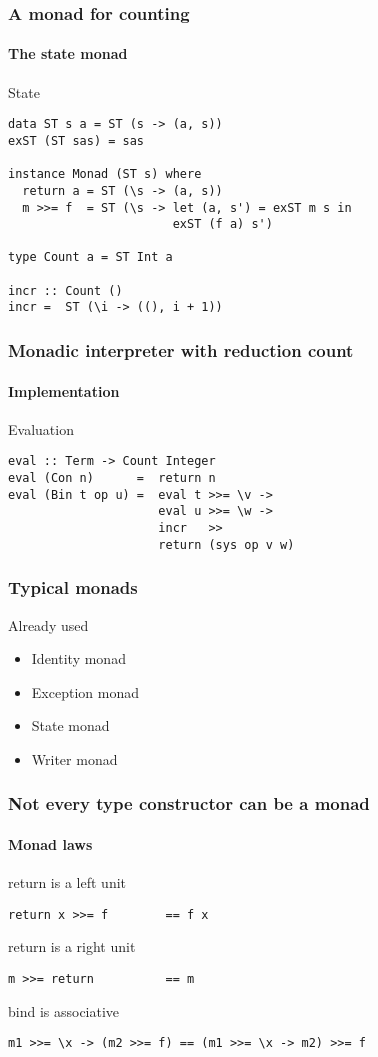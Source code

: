 \documentclass{beamer}
\begin{document}
\begin{frame}[fragile]
  \frametitle{A monad for counting}
  \framesubtitle{The state monad}
  \begin{alertblock}{State}
\begin{lstlisting}
data ST s a = ST (s -> (a, s))
exST (ST sas) = sas

instance Monad (ST s) where
  return a = ST (\s -> (a, s))
  m >>= f  = ST (\s -> let (a, s') = exST m s in
                       exST (f a) s')

type Count a = ST Int a

incr :: Count ()
incr =  ST (\i -> ((), i + 1))
\end{lstlisting} 
\end{alertblock}
\end{frame}

\begin{frame}[fragile]
  \frametitle{Monadic interpreter with reduction count}
  \framesubtitle{Implementation}
\begin{exampleblock}{Evaluation}
\begin{lstlisting}
eval :: Term -> Count Integer
eval (Con n)      =  return n
eval (Bin t op u) =  eval t >>= \v ->
                     eval u >>= \w ->
                     incr   >>
                     return (sys op v w)
\end{lstlisting} 
\end{exampleblock}
\end{frame}            

\begin{frame}[fragile]
  \frametitle{Typical monads}
  \begin{block}{Already used}
  \begin{itemize}       
  \item Identity monad
  \item Exception monad
  \item State monad
  \item Writer monad
  \end{itemize} 
  \end{block}   
\end{frame}

\begin{frame}[fragile]
  \frametitle{Not every type constructor can be a monad}
  \framesubtitle{Monad laws}
  \begin{alertblock}{return is a left unit}
\begin{lstlisting}
return x >>= f        == f x
\end{lstlisting}
  \end{alertblock}
  \begin{alertblock}{return is a right unit}
\begin{lstlisting}
m >>= return          == m
\end{lstlisting}
  \end{alertblock}
  \begin{alertblock}{bind is associative}
\begin{lstlisting}
m1 >>= \x -> (m2 >>= f) == (m1 >>= \x -> m2) >>= f
\end{lstlisting}
  \end{alertblock}
\end{frame}
\end{document}
